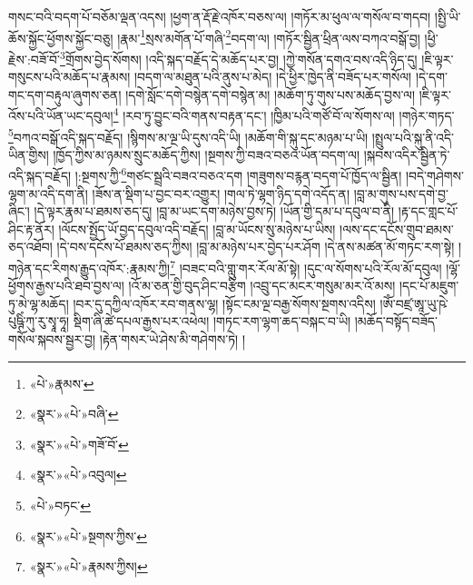 གསང་བའི་བདག་པོ་བཅོམ་ལྡན་འདས། །ཕྱག་ན་རྡོ་རྗེ་འཁོར་བཅས་ལ། །གཏོར་མ་ཕུལ་ལ་གསོལ་བ་གདབ། །སྤྱི་ཡི་ཆོས་སྐྱོང་ཕྱོགས་སྐྱོང་བཅུ། །རྣམ་\footnote{«པེ་»རྣམས་}སྲས་མགོན་པོ་གཞི་\footnote{«སྣར་»«པེ་»བཞི་}བདག་ལ། །གཏོར་སྦྱིན་ཕྲིན་ལས་བཀའ་བསྒོ་བྱ། །ཕྱི་རྗེས་:བཟོ་བོ་\footnote{«སྣར་»«པེ་»གཟོ་བོ་}གྲོགས་བྱེད་སོགས། །འདི་སྐད་བརྗོད་དེ་མཆོད་པར་བྱ། །ཀྱེ་གསོན་དགའ་བས་འདི་ཉིད་དུ། །ཇི་ལྟར་གསུངས་པའི་མཆོད་པ་རྣམས། །བདག་ལ་མཐུན་པའི་ནུས་པ་མེད། །དེ་ཕྱིར་ཁྱེད་ནི་བཟོད་པར་གསོལ། །དེ་དག་གང་དག་བརྟུལ་ཞུགས་ཅན། །དགེ་སློང་དགེ་བསྙེན་དགེ་བསྙེན་མ། །མཆོག་ཏུ་གུས་པས་མཆོད་བྱས་ལ། །ཇི་ལྟར་འོས་པའི་ཡོན་ཡང་དབུལ།\footnote{«སྣར་»«པེ་»འབུལ།} །རབ་ཏུ་བྱུང་བའི་གནས་བརྟན་དང་། །ཁྱིམ་པའི་གཙོ་བོ་ལ་སོགས་ལ། །གཉེར་གཏད་\footnote{«པེ་»བཏང་}བཀའ་བསྒོ་འདི་སྐད་བརྗོད། །སྙིགས་མ་ལྔ་ཡི་དུས་འདི་ཡི། །མཆོག་གི་སྐུ་དང་མཉམ་པ་ཡི། །སྤྲུལ་པའི་སྐུ་ནི་འདི་ཡིན་གྱིས། །ཁྱོད་ཀྱིས་མ་ཉམས་སྲུང་མཆོད་ཀྱིས། །སྔགས་ཀྱི་བཟའ་བཅའ་ཡོན་བདག་ལ། །སྐབས་འདིར་སྦྱིན་ཏེ་འདི་སྐད་བརྗོད། །:སྔགས་ཀྱི་\footnote{«སྣར་»«པེ་»སྔགས་ཀྱིས་}གཙང་སྦྲའི་བཟའ་བཅའ་དག །གཟུགས་བརྙན་བདག་པོ་ཁྱོད་ལ་སྦྱིན། །བདེ་གཤེགས་ལྷག་མ་འདི་དག་ནི། །ཟོས་ན་སྡིག་པ་བྱང་བར་འགྱུར། །གལ་ཏེ་ལྷག་ཉིད་དགེ་འདོད་ན། །བླ་མ་གུས་པས་དགེ་བྱ་ཞིང་། །དེ་ལྟར་རྣམ་པ་ཐམས་ཅད་དུ། །བླ་མ་ཡང་དག་མཉེས་བྱས་ཏེ། །ཡོན་གྱི་དམ་པ་དབུལ་བ་ནི། །རྟ་དང་གླང་པོ་ཤིང་རྟ་ནོར། །ལོངས་སྤྱོད་ཡོ་བྱད་དབུལ་འདི་བརྗོད། །བླ་མ་ཡོངས་སུ་མཉེས་པ་ཡིས། །ལས་དང་དངོས་གྲུབ་ཐམས་ཅད་འཐོབ། །དེ་བས་དངོས་པོ་ཐམས་ཅད་ཀྱིས། །བླ་མ་མཉེས་པར་བྱེད་པར་ཤོག །དེ་ནས་མཚན་མོ་གཏང་རག་སྟེ། །གཉེན་དང་རིགས་རྒྱུད་འཁོར་:རྣམས་ཀྱི།\footnote{«སྣར་»«པེ་»རྣམས་ཀྱིས།} །བཟང་བའི་གླུ་གར་རོལ་མོ་སྟེ། །དུང་ལ་སོགས་པའི་རོལ་མོ་དབུལ། །ལྷོ་ཕྱོགས་རྒྱས་པའི་ཐབ་བྱས་ལ། །འོ་མ་ཅན་གྱི་བུད་ཤིང་བརྩིག །འབྲུ་དང་མངར་གསུམ་མར་འོ་མས། །དང་པོ་མཇུག་ཏུ་མེ་ལྷ་མཆོད། །བར་དུ་དཀྱིལ་འཁོར་རབ་གནས་ལྷ། །སྟོང་ངམ་ལྔ་བརྒྱ་སོགས་སྔགས་འདིས། །ཨོཾ་བཛྲ་ཨཱ་ཡུ་ཥེ་པུཥྚིཾ་ཀུ་རུ་སྭཱ་ཧཱ། སྡིག་ཞི་ཚེ་དཔལ་རྒྱས་པར་འཕེལ། །གཏང་རག་ལྷག་ཆད་བསྐང་བ་ཡི། །མཆོད་བསྟོད་བཟོད་གསོལ་སྐབས་སྦྱར་བྱ། །རྟེན་གསར་ཡེ་ཤེས་མི་གཤེགས་ཏེ། །
